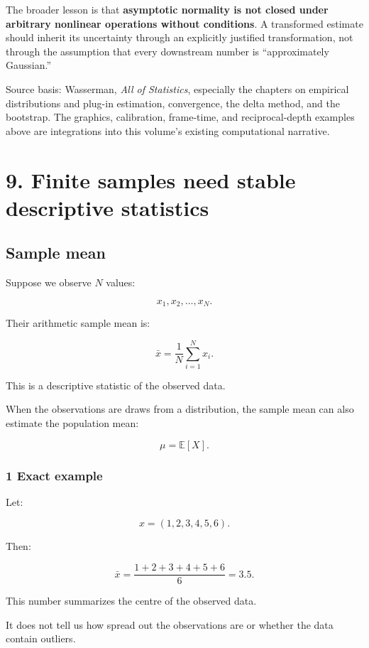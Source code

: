 The broader lesson is that \textbf{asymptotic normality is not closed under arbitrary nonlinear operations without conditions}. A transformed estimate should inherit its uncertainty through an explicitly justified transformation, not through the assumption that every downstream number is ``approximately Gaussian.''

Source basis: Wasserman, \emph{All of Statistics}, especially the chapters on empirical distributions and plug-in estimation, convergence, the delta method, and the bootstrap. The graphics, calibration, frame-time, and reciprocal-depth examples above are integrations into this volume's existing computational narrative.

\section{9. Finite samples need stable descriptive statistics}\label{02-foundations-ii-ch030-finite-samples-need-stable-descriptive-statistics}

\subsection{Sample mean}\label{02-foundations-ii-ch030-sample-mean}

Suppose we observe \(N\) values:

\[
 x_1,x_2,\ldots,x_N.
\]

Their arithmetic sample mean is:

\[
 \boxed{ \bar x=\frac1N\sum_{i=1}^{N}x_i }.
\]

This is a descriptive statistic of the observed data.

When the observations are draws from a distribution, the sample mean can also estimate the population mean:

\[
 \mu=\mathbb E[X].
\]

\subsubsection{1 Exact example}\label{02-foundations-ii-ch030-exact-example}

Let:

\[
 x=(1,2,3,4,5,6).
\]

Then:

\[
 \bar x= \frac{1+2+3+4+5+6}{6} =\boxed{3.5}.
\]

This number summarizes the centre of the observed data.

It does not tell us how spread out the observations are or whether the data contain outliers.

